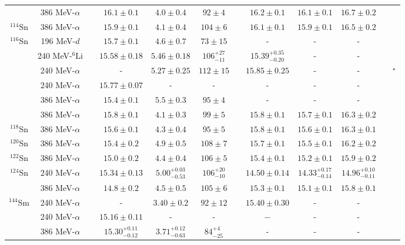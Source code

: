 \begin{table}[t!]
{\begin{tabular}{@{}cccccccccc@{}cc}
  & 386 MeV-$\alpha$ & & $16.1\pm0.1$ & $4.0\pm0.4$ & $92\pm4$ & & $16.2\pm0.1$ & $16.1\pm0.1$ & $16.7\pm0.2$ & & \cite{Li_2010} \\
$^{114}$Sn & 386 MeV-$\alpha$ & & $15.9\pm0.1$ & $4.1\pm0.4$ & $104\pm6$ & & $16.1\pm0.1$ & $15.9\pm0.1$ & $16.5\pm0.2$ & & \cite{Li_2010} \\
$^{116}$Sn & 196 MeV-$d$ & & $15.7\pm0.1$ & $4.6\pm0.7$ & $73\pm15$ & & - & - & - & & \cite{Darshana2015} \\
  & 240 MeV-$^{6}$Li & & $15.58\pm0.18$ & $5.46\pm0.18$ & ${106}^{+27}_{-11}$ & & ${15.39}^{+0.35}_{-0.20}$ & - & - & & \cite{DHY2009_Sn} \\
  & 240 MeV-$\alpha$ & & - & $5.27\pm0.25$ & $112\pm15$ & & $15.85\pm0.25$ & - & - & & \cite{dhybg}$^\star$ \\
  & 240 MeV-$\alpha$ & & $15.77\pm0.07$ & - & - & & - & - & - & & \cite{dhyprl} \\
  & 386 MeV-$\alpha$ & & $15.4\pm0.1$ & $5.5\pm0.3$ & $95\pm4$ & & - & - & - & & \cite{Uchida_90Zr} \\
  & 386 MeV-$\alpha$ & & $15.8\pm0.1$ & $4.1\pm0.3$ & $99\pm5$ & & $15.8\pm0.1$ & $15.7\pm0.1$ & $16.3\pm0.2$ & & \cite{Li_2010} \\
$^{118}$Sn & 386 MeV-$\alpha$ & & $15.6\pm0.1$ & $4.3\pm0.4$ & $95\pm5$ & & $15.8\pm0.1$ & $15.6\pm0.1$ & $16.3\pm0.1$ & & \cite{Li_2010} \\
$^{120}$Sn & 386 MeV-$\alpha$ & & $15.4\pm0.2$ & $4.9\pm0.5$ & $108\pm7$ & & $15.7\pm0.1$ & $15.5\pm0.1$ & $16.2\pm0.2$ & & \cite{Li_2010} \\
$^{122}$Sn & 386 MeV-$\alpha$ & & $15.0\pm0.2$ & $4.4\pm0.4$ & $106\pm5$ & & $15.4\pm0.1$ & $15.2\pm0.1$ & $15.9\pm0.2$ & & \cite{Li_2010} \\
$^{124}$Sn & 240 MeV-$\alpha$ & & $15.34\pm0.13$ & ${5.00}^{+0.03}_{-0.53}$ & ${106}^{+20}_{-10}$ & & $14.50\pm0.14$ & ${14.33}^{+0.17}_{-0.14}$ & ${14.96}^{+0.10}_{-0.11}$ & & \cite{DHY2004_Sn} \\
  & 386 MeV-$\alpha$ & & $14.8\pm0.2$ & $4.5\pm0.5$ & $105\pm6$ & & $15.3\pm0.1$ & $15.1\pm0.1$ & $15.8\pm0.1$ & & \cite{Li_2010} \\
$^{144}$Sm & 240 MeV-$\alpha$ & & - & $3.40\pm0.2$ & $92\pm12$ & & $15.40\pm0.30$ & - & - & & \cite{dhybg} \\
  & 240 MeV-$\alpha$ & & $15.16\pm0.11$ & - & - & & $-$ & - & - & & \cite{dhyprl} \\
  & 386 MeV-$\alpha$ & & ${15.30}^{+0.11}_{-0.12}$& ${3.71}^{+0.12}_{-0.63}$ & ${84}^{+4}_{-25}$ & & - & - & - & & \cite{Itoh_prc2003} \\

\end{tabular}}
\end{table}
